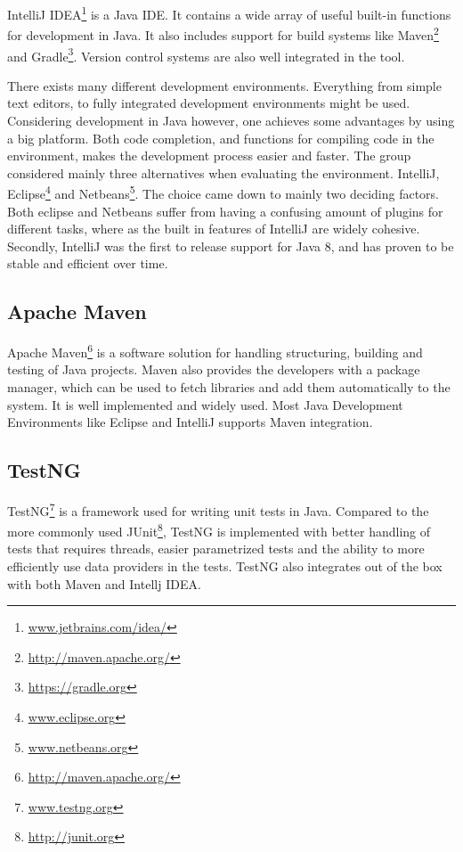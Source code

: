 IntelliJ IDEA\footnote{\url{www.jetbrains.com/idea/}} is a Java IDE. It contains a wide array of useful built-in functions for development in Java. It also includes support for build systems like Maven\footnote{\url{http://maven.apache.org/}} and Gradle\footnote{\url{https://gradle.org}}. Version control systems are also well integrated in the tool.

There exists many different development environments. Everything from simple text editors, to fully integrated development environments might be used. Considering development in Java however, one achieves some advantages by using a big platform. Both code completion, and functions for compiling code in the environment, makes the development process easier and faster. The group considered mainly three alternatives when evaluating the environment. IntelliJ, Eclipse\footnote{\url{www.eclipse.org}} and Netbeans\footnote{\url{www.netbeans.org}}. The choice came down to mainly two deciding factors. Both eclipse and Netbeans suffer from having a confusing amount of plugins for different tasks, where as the built in features of IntelliJ are widely cohesive. Secondly, IntelliJ was the first to release support for Java 8, and has proven to be stable and efficient over time.

\subsection{Apache Maven}
\label{subsec:prestudies-tools-apache_maven}

Apache Maven\footnote{\url{http://maven.apache.org/}} is a software solution for handling structuring, building and testing of Java projects. Maven also provides the developers with a package manager, which can be used to fetch libraries and add them automatically to the system. It is well implemented and widely used. Most Java Development Environments like Eclipse and IntelliJ supports Maven integration.

\subsection{TestNG}
\label{subsec:prestudies-tools-testng}

TestNG\footnote{\url{www.testng.org}} is a framework used for writing unit tests in Java. Compared to the more commonly used JUnit\footnote{\url{http://junit.org}}, TestNG is implemented with better handling of tests that requires threads, easier parametrized tests and the ability to more efficiently use data providers in the tests. TestNG also integrates out of the box with both Maven and Intellj IDEA.


